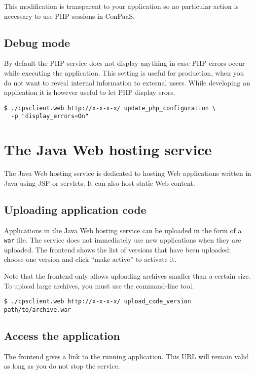 \documentclass[10pt]{article}
\begin{document}
This modification is transparent to your application so no particular
action is necessary to use PHP sessions in ConPaaS.

\subsection{Debug mode}

By default the PHP service does not display anything in case PHP
errors occur while executing the application. This setting is useful
for production, when you do not want to reveal internal information to
external users. While developing an application it is however useful
to let PHP display erors.
\begin{verbatim}
$ ./cpsclient.web http://x-x-x-x/ update_php_configuration \
  -p "display_errors=On" 
\end{verbatim}

\section{The Java Web hosting service}

The Java Web hosting service is dedicated to hosting Web applications
written in Java using JSP or servlets. It can also host static Web
content.

\subsection{Uploading application code}

Applications in the Java Web hosting service can be uploaded in the
form of a \texttt{war} file. The service does not immediately use new
applications when they are uploaded. The frontend shows the list of
versions that have been uploaded; choose one version and click ``make
active'' to activate it.  

Note that the frontend only allows uploading archives smaller than a
certain size.  To upload large archives, you must use the command-line
tool.
\begin{verbatim}
$ ./cpsclient.web http://x-x-x-x/ upload_code_version path/to/archive.war
\end{verbatim}

\subsection{Access the application}

The frontend gives a link to the running application. This URL will
remain valid as long as you do not stop the service.
\end{document}
